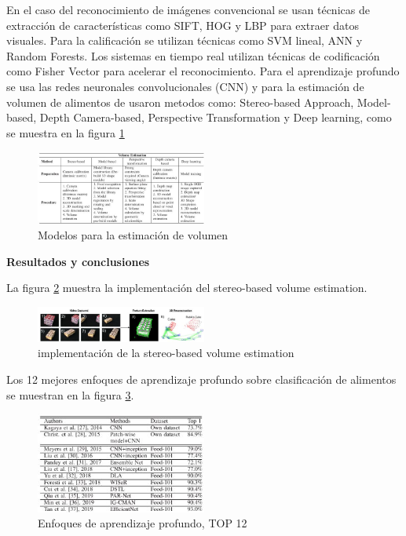 En el caso del reconocimiento de imágenes convencional se usan técnicas de extracción de características como SIFT, HOG y LBP para extraer datos visuales. Para la calificación se utilizan técnicas como SVM lineal, ANN y Random Forests. Los sistemas en tiempo real utilizan técnicas de codificación como Fisher Vector para acelerar el reconocimiento. Para el aprendizaje profundo se usa las redes neuronales convolucionales (CNN)  y para la estimación de volumen de alimentos de usaron metodos como: Stereo-based Approach, Model-based, Depth Camera-based, Perspective Transformation y Deep learning, como se muestra en la figura \ref{fig15}

\begin{figure}[h]
		\begin{center}
			\includegraphics[width=0.5\textwidth]{2/imagen2/14FIGURA14PAPER4.JPG}
	        \caption{ Modelos para la estimación de volumen}
			\label{fig15}
		\end{center}
		
	\end{figure}

\textbf{Resultados y conclusiones}

\thinspace
La figura \ref{fig16} muestra la implementación del stereo-based volume estimation.

\begin{figure}[h]
		\begin{center}
			\includegraphics[width=0.5\textwidth]{2/imagen2/16FIGURA16PAPER4.JPG}
	        \caption{ implementación de la stereo-based volume estimation}
			\label{fig16}
		\end{center}
		
	\end{figure}


Los 12 mejores enfoques de aprendizaje profundo sobre clasificación de alimentos se muestran en la figura \ref{fig17}.

\begin{figure}[h]
		\begin{center}
			\includegraphics[width=0.5\textwidth]{2/imagen2/17FIGURA17PAPER4.JPG}
	        \caption{  Enfoques de aprendizaje profundo, TOP 12}
			\label{fig17}
		\end{center}
		
	\end{figure}

